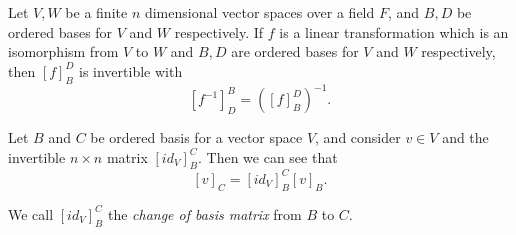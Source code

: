 \begin{lemma}\label{inverse-transformation-matrix}
    Let $V, W$ be a finite $n$ dimensional vector spaces over a field $F$, and $B, D$ be ordered bases for $V$ and $W$ respectively. If $f$ is a linear transformation which is an isomorphism from $V$ to $W$ and $B, D$ are ordered bases for $V$ and $W$ respectively, then
    $[f]_B^D$ is invertible with
    \[[f^{-1}]_D^B = \left([f]_B^D\right)^{-1}.\]
\end{lemma}

Let $B$ and $C$ be ordered basis for a vector space $V$, and consider $v \in V$ and the invertible $n \times n$ matrix $[id_V]_B^C$. Then we can see that
\[[v]_C = [id_V]_B^C[v]_B.\]

\begin{defn}
    We call $[id_V]_B^C$ the \emph{change of basis matrix} from $B$ to $C$.
\end{defn}

